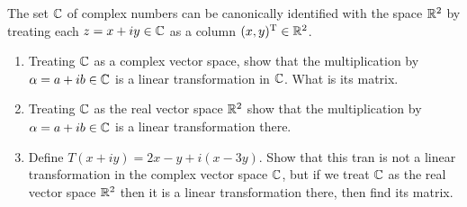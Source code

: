 \begin{exercise}
  The set $\mathbb{C}$ of complex numbers can be canonically identified 
  with the space $\mathbb{R}^2$ by treating each $z=x+iy\in\mathbb{C}$ as a column
  $(x,y)^\mathrm{T}\in\mathbb{R}^2$.
  \begin{enumerate}
    \item Treating $\mathbb{C}$ as a complex vector space, show that the multiplication
      by $\alpha=a+ib\in\mathbb{C}$ is a linear transformation in $\mathbb{C}$.
      What is its matrix.
    \item Treating $\mathbb{C}$ as the real vector space $\mathbb{R}^2$ show that the multiplication 
      by $\alpha=a+ib\in\mathbb{C}$ is a linear transformation there.
    \item Define $T(x+iy)=2x-y+i(x-3y)$. Show that this tran is not a 
      linear transformation in the complex vector space $\mathbb{C}$, but
      if we treat $\mathbb{C}$ as the real vector space $\mathbb{R}^2$ then it is a linear
      transformation there, then find its matrix.
  \end{enumerate}
\end{exercise}
